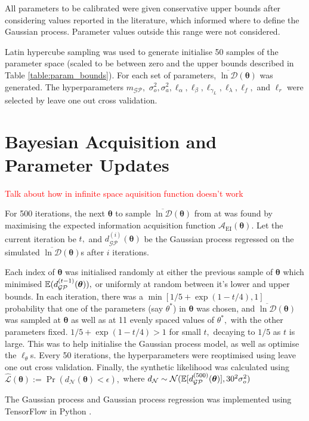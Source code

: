 All parameters to be calibrated were given conservative upper bounds after
considering values reported in the literature, which informed where to define
the Gaussian process. Parameter values outside this range were not considered.

Latin hypercube sampling was used to generate initialise 50 samples of the
parameter space (scaled to be between zero and the upper bounds described in
Table \ref{table:param_bounds}). For each set of parameters,
$\overline{\ln\mathcal{D}}(\bm{\theta})$ was generated. The hyper\-parameters
$m_\mathcal{GP},$ $\sigma_o^2, \sigma_a^2, \ell_\alpha,
    \ell_\beta, \ell_{\gamma_L}, \ell_\lambda, \ell_f,$
and $\ell_r$ were selected by leave one out cross validation.

\section{Bayesian Acquisition and Parameter Updates}

\textcolor{red}{Talk about how in infinite space aquisition function doesn't
    work}

For 500 iterations, the next $\bm{\theta}$ to sample
$\overline{\ln\mathcal{D}}(\bm{\theta})$ from
at was found by maximising the expected information acquisition function
$\mathcal{A}_\text{EI}(\bm{\theta})$.
Let the current iteration be $t,$ and $d_\mathcal{GP}^{(i)}(\bm{\theta})$
be the Gaussian process regressed on the
simulated $\overline{\ln\mathcal{D}}(\bm{\theta})$s after $i$ iterations.

Each index of $\bm{\theta}$ was initialised randomly at either the
previous sample of $\bm{\theta}$
which minimised $\operatorname{\mathbb{E}}(d_\mathcal{GP}^{(t-1)}(\bm{\theta})),$ or uniformly at
random between it's lower and upper bounds. In each iteration, there was a
$\min\left[1/5 + \exp(1 - t/4), 1 \right]$ probability that one of the
parameters (say $\theta^*$) in $\bm{\theta}$
was chosen, and $\overline{\ln\mathcal{D}}(\bm{\theta})$ was sampled at
$\bm{\theta}$ as well as at 11 evenly spaced values of
$\theta^*,$ with the other parameters fixed.
$1/5 + \exp(1 - t/4)>1$ for small $t,$ decaying to $1/5$ as $t$ is
large. This was to help initialise the Gaussian process model, as well as
optimise the $\ell_\theta$s. Every 50 iterations, the hyperparameters were
reoptimised using leave one out cross validation. Finally, the synthetic
likelihood was calculated using
$\hat{\mathcal{L}}(\bm{\theta}) := \Pr(d_\mathcal{N}(\bm{\theta}) < \epsilon),$
where
$d_\mathcal{N}
    \sim \mathcal{N}(\operatorname{\mathbb{E}}[d_\mathcal{GP}^{(500)}(\bm{\theta})], 30^2\sigma_o^2)$

The Gaussian process and Gaussian process regression was implemented using
TensorFlow in Python \parencite{abadi_tensorflow_2015}.


